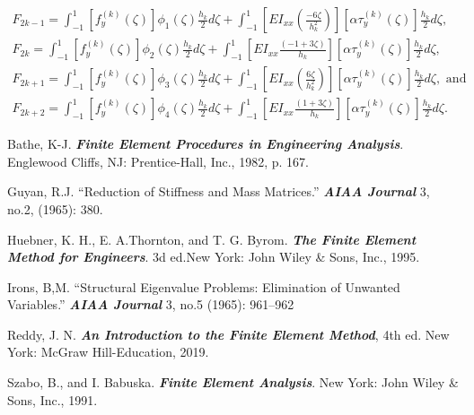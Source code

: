 \documentclass{AeroStructure-ERJohnson}
\begin{document}
\begin{gather}
F_{2 k-1}=\int_{-1}^{1}\left[f_{y}^{(k)}(\zeta)\right] \phi_{1}(\zeta) \frac{h_{k}}{2} d \zeta+\int_{-1}^{1}\left[E I_{x x}\left(\frac{-6 \zeta}{h_{k}^{2}}\right)\right]\left[\alpha \tau_{y}^{(k)}(\zeta)\right] \frac{h_{k}}{2} d \zeta, \label{eq17.152} \\
F_{2 k}=\int_{-1}^{1}\left[f_{y}^{(k)}(\zeta)\right] \phi_{2}(\zeta) \frac{h_{k}}{2} d \zeta+\int_{-1}^{1}\left[E I_{x x} \frac{(-1+3 \zeta)}{h_{k}}\right]\left[\alpha \tau_{y}^{(k)}(\zeta)\right] \frac{h_{k}}{2} d \zeta, \label{eq17.153} \\
F_{2 k+1}=\int_{-1}^{1}\left[f_{y}^{(k)}(\zeta)\right] \phi_{3}(\zeta) \frac{h_{k}}{2} d \zeta+\int_{-1}^{1}\left[E I_{x x}\left(\frac{6 \zeta}{h_{k}^{2}}\right)\right]\left[\alpha \tau_{y}^{(k)}(\zeta)\right] \frac{h_{k}}{2} d \zeta, \textrm{ and}\label{eq17.154} \\
F_{2 k+2}=\int_{-1}^{1}\left[f_{y}^{(k)}(\zeta)\right] \phi_{4}(\zeta) \frac{h_{k}}{2} d \zeta+\int_{-1}^{1}\left[E I_{x x} \frac{(1+3 \zeta)}{h_{k}}\right]\left[\alpha \tau_{y}^{(k)}(\zeta)\right] \frac{h_{k}}{2} d \zeta. \label{eq17.155}
\end{gather}

\begin{thebibliography}{}\label{sec17.5}
\bibitem{} Bathe, K-J. \textit{\textbf{Finite Element Procedures in Engineering Analysis}}. Englewood Cliffs, NJ: Prentice-Hall, Inc., 1982, p. 167.

\bibitem{} Guyan, R.J. ``Reduction of Stiffness and Mass Matrices.'' \textit{\textbf{AIAA Journal}} 3, no.2, (1965): 380.

\bibitem{} Huebner, K. H., E. A.Thornton, and T. G. Byrom. \textit{\textbf{The Finite Element Method for Engineers}}. 3d ed.New York: John Wiley \& Sons, Inc., 1995.\label{Huebner}

\bibitem{} Irons, B,M. ``Structural Eigenvalue Problems: Elimination of Unwanted Variables.'' \textit{\textbf{AIAA Journal}} 3, no.5 (1965): 961--962

\bibitem{} Reddy, J. N. \textit{\textbf{An Introduction to the Finite Element Method}}, 4th ed. New York: McGraw Hill-Education, 2019.\label{Reddy}

\bibitem{} Szabo, B., and I. Babuska. \textit{\textbf{Finite Element Analysis}}. New York: John Wiley \& Sons, Inc., 1991.\label{SzaboBabuska}
\end{thebibliography}
\end{document}
